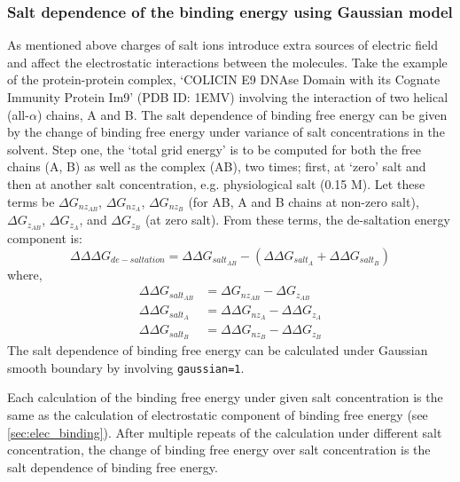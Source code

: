 \documentclass[9pt,tutorial,pubversion]{livecoms}
\begin{document}
\subsubsection{Salt dependence of the binding energy using Gaussian model} \label{sec:salt-dependence-of-the-binding-energy-using-Gaussian-model}
As mentioned above charges of salt ions introduce extra sources of electric field and affect the electrostatic interactions between the molecules.  Take the example of the protein-protein complex, `COLICIN E9 DNAse Domain with its Cognate Immunity Protein Im9' (PDB ID: 1EMV) involving the interaction of two helical (all-$ \alpha $) chains, A and B. The salt dependence of binding free energy can be given by the change of binding free energy under variance of salt concentrations in the solvent. Step one, the ‘total grid energy’ is to be computed for both the free chains (A, B) as well as the complex (AB), two times; first, at `zero' salt and then at another salt concentration, e.g. physiological salt (0.15 M). Let these terms be $ \Delta G_{nz_{AB}}$, $ \Delta G_{nz_A}$, $ \Delta G_{nz_B}$ (for AB, A and B chains at non-zero salt), $ \Delta G_{z_{AB}}$, $ \Delta G_{z_A} $, and $ \Delta G_{z_B}$ (at zero salt). From these terms, the de-saltation energy component is:
\begin{equation}
 \Delta\Delta\Delta G_{de-saltation}= \Delta\Delta G_{salt_{AB}}  - \left( \Delta\Delta G_{salt_A}  + \Delta\Delta G_{salt_B} \right)
\end{equation}
where,
\begin{equation}
\begin{aligned}
\Delta\Delta G_{salt_{AB}}  &= \Delta G_{nz_{AB}}  - \Delta G_{z_{AB}}
\nonumber \\
\Delta\Delta G_{salt_A}  &= \Delta\Delta G_{nz_A}  - \Delta\Delta G_{z_A} \nonumber \\
\Delta\Delta G_{salt_B}  &= \Delta\Delta G_{nz_B}  - \Delta\Delta G_{z_B} \nonumber
\end{aligned}
\end{equation}
The salt dependence of binding free energy can be calculated under Gaussian smooth boundary by involving \texttt{gaussian=1}\cite{jia2017treating}. 

Each calculation of the binding free energy under given salt concentration is the same as the calculation of electrostatic component of binding free energy (see \ref{sec:elec_binding}). After multiple repeats of the calculation under different salt concentration, the change of binding free energy over salt concentration is the salt dependence of binding free energy.
\end{document}
